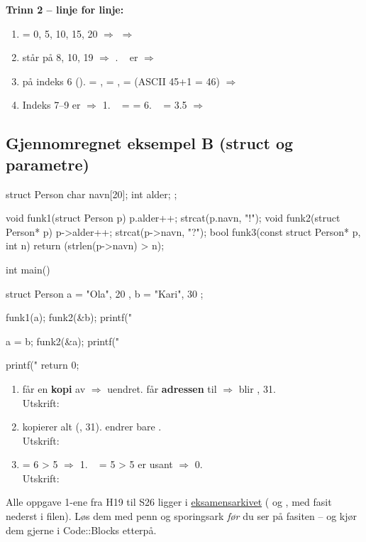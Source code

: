 \textbf{Trinn 2 -- linje for linje:}
\begin{enumerate}
  \item {} = 0, 5, 10, 15, 20 $\Rightarrow$  $\Rightarrow$ 
  \item {} står på 8, 10, 19 $\Rightarrow$ . \  er  $\Rightarrow$ 
  \item {} på indeks 6 ().  = ,  = ,  =  (ASCII 45+1 = 46) $\Rightarrow$ 
  \item Indeks 7--9 er  $\Rightarrow$ 1. \  =  = 6. \  = 3.5 $\Rightarrow$ 
\end{enumerate}

\subsection{Gjennomregnet eksempel B (struct og parametre)}
\begin{kode}
struct Person  {  char navn[20];  int alder;  };

void funk1(struct Person p)    {  p.alder++;   strcat(p.navn, "!");  }
void funk2(struct Person* p)   {  p->alder++;  strcat(p->navn, "?");  }
bool funk3(const struct Person* p, int n)  {  return (strlen(p->navn) > n);  }

int main()  {
  struct Person a = { "Ola", 20 },  b = { "Kari", 30 };

  funk1(a);   funk2(&b);
  printf("%

  a = b;   funk2(&a);
  printf("%

  printf("%
  return 0;
}
\end{kode}
\begin{enumerate}
  \item {} får en \textbf{kopi} av  $\Rightarrow$  uendret.  får \textbf{adressen} til  $\Rightarrow$  blir , 31.\\
        Utskrift: 
  \item {} kopierer alt (, 31).  endrer bare .\\
        Utskrift: 
  \item {} = 6 > 5 $\Rightarrow$ 1. \  = 5 > 5 er usant $\Rightarrow$ 0.\\
        Utskrift: 
\end{enumerate}

\begin{tips}
Alle oppgave 1-ene fra H19 til S26 ligger i \href{https://frh.folk.ntnu.no/grprog/eksamen/}{eksamensarkivet}
( og , med fasit nederst i filen).
Løs dem med penn og sporingsark \emph{før} du ser på fasiten -- og kjør dem gjerne i Code::Blocks etterpå.
\end{tips}

